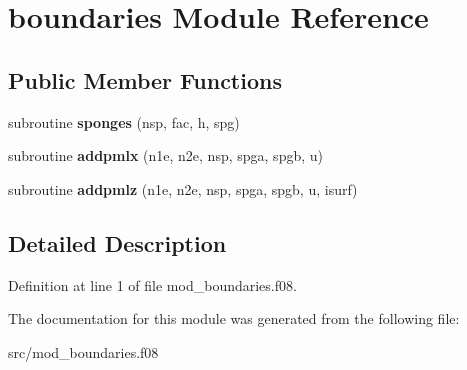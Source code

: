 \hypertarget{classboundaries}{\section{boundaries Module Reference}
\label{classboundaries}
}
\subsection*{Public Member Functions}
\begin{DoxyCompactItemize}
\item 
\hypertarget{classboundaries_ad580bdf71455188e4f1d2fb3e985f15d}{subroutine {\bfseries sponges} (nsp, fac, h, spg)}\label{classboundaries_ad580bdf71455188e4f1d2fb3e985f15d}

\item 
\hypertarget{classboundaries_a6b929eebb97051e146bc456f79f55397}{subroutine {\bfseries addpmlx} (n1e, n2e, nsp, spga, spgb, u)}\label{classboundaries_a6b929eebb97051e146bc456f79f55397}

\item 
\hypertarget{classboundaries_a2279b54b00b56424849141a40a5249cc}{subroutine {\bfseries addpmlz} (n1e, n2e, nsp, spga, spgb, u, isurf)}\label{classboundaries_a2279b54b00b56424849141a40a5249cc}

\end{DoxyCompactItemize}


\subsection{Detailed Description}


Definition at line 1 of file mod\-\_\-boundaries.\-f08.



The documentation for this module was generated from the following file\-:\begin{DoxyCompactItemize}
\item 
src/mod\-\_\-boundaries.\-f08\end{DoxyCompactItemize}
